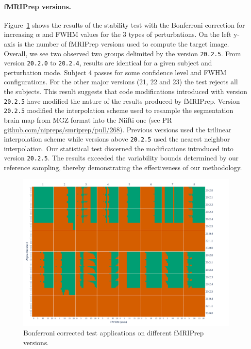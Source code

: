 \documentclass[lettersize,journal]{IEEEtran}
\newcommand{\fmriprep}{fMRIPrep\xspace}
\begin{document}
\paragraph*{\fmriprep versions.} Figure~\ref{fig:version_bonferroni} shows the results of the stability test with the Bonferroni correction for increasing $\alpha$ and FWHM values for the 3 types of perturbations. On the left y-axis is the number of \fmriprep versions used to compute the target image. Overall, we see two observed two groups delimited by the version \texttt{20.2.5}. From version \texttt{20.2.0} to \texttt{20.2.4}, results are identical for a given subject and perturbation mode. Subject 4 passes for some confidence level and FWHM configurations. For the other major versions (21, 22 and 23) the test rejects all the subjects. This result suggests that code modifications introduced with version \texttt{20.2.5} have modified the nature of the results produced by \fmriprep. Version \texttt{20.2.5} modified the interpolation scheme used to resample the segmentation brain map from MGZ format into the Niifti one (see PR \href{https://github.com/nipreps/smriprep/pull/268}{\url{github.com/nipreps/smriprep/pull/268}}). Previous versions used the trilinear interpolation scheme while versions above \texttt{20.2.5} used the nearest neighbor interpolation. Our statistical test discerned the modifications introduced into version \texttt{20.2.5}. The results exceeded the variability bounds determined by our reference sampling, thereby demonstrating the effectiveness of our methodology.


\begin{figure}
    \centering
    \includegraphics[width=\linewidth]{figures/fmriprep-versions/bonferroni.pdf}
    \caption{Bonferroni corrected test applications on different \fmriprep versions.}
    \label{fig:version_bonferroni}
\end{figure}
\end{document}
